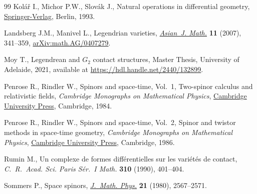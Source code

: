 \documentclass[10pt,a4paper]{amsart}
\numberwithin{equation}{section}
\begin{document}
\begin{thebibliography}{99}
Kol\'a\v{r} I., Michor P.W., Slov\'ak J., Natural operations in differential
 geometry, \href{https://doi.org/10.1007/978-3-662-02950-3}{Springer-Verlag}, Berlin, 1993.

Landsberg J.M., Manivel L., Legendrian varieties, \href{https://doi.org/10.4310/AJM.2007.v11.n3.a1}{\textit{Asian~J. Math.}}
 \textbf{11} (2007), 341--359, \href{https://arxiv.org/abs/math.AG/0407279}{arXiv:math.AG/0407279}.

Moy T., Legendrean and $G_2$ contact structures, {M}aster {T}hesis, University
 of Adelaide, 2021, available at \url{https://hdl.handle.net/2440/132899}.

Penrose R., Rindler W., Spinors and space-time, {V}ol.~1, Two-spinor calculus
 and relativistic fields, \textit{Cambridge Monographs on Mathematical Physics},
 \href{https://doi.org/10.1017/CBO9780511564048}{Cambridge University Press}, Cambridge, 1984.

Penrose R., Rindler W., Spinors and space-time, {V}ol.~2, {S}pinor and twistor
 methods in space-time geometry, \textit{Cambridge Monographs on Mathematical Physics},
 \href{https://doi.org/10.1017/CBO9780511524486}{Cambridge University Press}, Cambridge, 1986.

Rumin M., Un complexe de formes diff\'erentielles sur les vari\'et\'es de
 contact, \textit{C.~R.~Acad. Sci. Paris S\'er.~I Math.} \textbf{310} (1990),
 401--404.

Sommers P., Space spinors, \href{https://doi.org/10.1063/1.524351}{\textit{J.~Math. Phys.}} \textbf{21} (1980),
 2567--2571.

\end{thebibliography}
\end{document}

